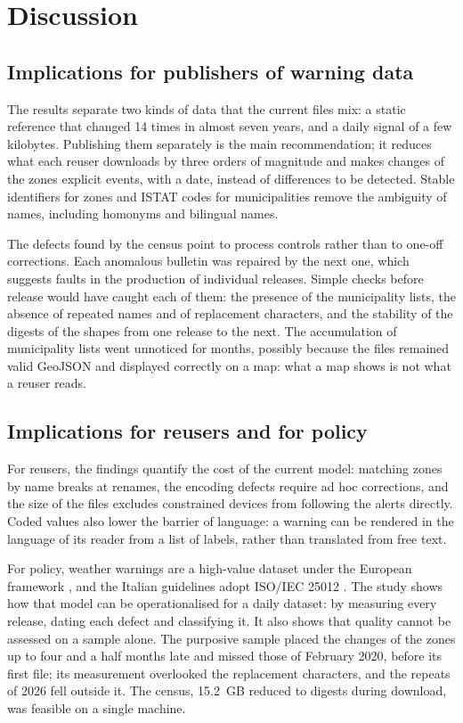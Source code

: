 \documentclass[review,authoryear,12pt]{elsarticle}
\begin{document}
\section{Discussion}
\label{sec:discussion}

\subsection{Implications for publishers of warning data}

The results separate two kinds of data that the current files mix: a static
reference that changed 14 times in almost seven years, and a daily signal of a
few kilobytes. Publishing them separately is the main recommendation; it
reduces what each reuser downloads by three orders of magnitude and makes
changes of the zones explicit events, with a date, instead of differences to
be detected. Stable identifiers for zones and ISTAT codes for municipalities
remove the ambiguity of names, including homonyms and bilingual names.

The defects found by the census point to process controls rather than to
one-off corrections. Each anomalous bulletin was repaired by the next one,
which suggests faults in the production of individual releases. Simple checks
before release would have caught each of them: the presence of the
municipality lists, the absence of repeated names and of replacement
characters, and the stability of the digests of the shapes from one release
to the next. The accumulation of municipality lists went
unnoticed for months, possibly because the files remained valid GeoJSON and
displayed correctly on a map: what a map shows is not what a reuser reads.

\subsection{Implications for reusers and for policy}

For reusers, the findings quantify the cost of the current model: matching
zones by name breaks at renames, the encoding defects require ad hoc
corrections, and the size of the files excludes constrained devices from
following the alerts directly. Coded values also lower the barrier of language:
a warning can be rendered in the language of its reader from a list of
labels, rather than translated from free text.

For policy, weather warnings are a high-value dataset under the European
framework \citep{eu2023hvd}, and the Italian guidelines adopt ISO/IEC 25012
\citep{agid2023}. The study shows how that model can be operationalised for a
daily dataset: by measuring every release, dating each defect and classifying
it. It also shows that quality cannot be assessed on a sample alone. The
purposive sample placed the changes of the zones up to four and a half months
late and missed those of February 2020, before its first file; its
measurement overlooked the replacement characters, and the repeats of 2026
fell outside it. The census,
15.2~GB reduced to digests during download, was feasible on a single machine.
\end{document}
